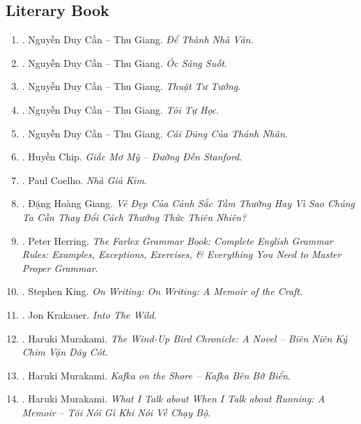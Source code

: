\documentclass{article}
\begin{document}

\subsection{Literary Book}

\begin{enumerate}
	\item \cite{Can_dtnv}. {\sc Nguyễn Duy Cần -- Thu Giang}. {\it Để Thành Nhà Văn}.\hfill{\sf[done]}
	\item \cite{Can_oss}. {\sc Nguyễn Duy Cần -- Thu Giang}. {\it Óc Sáng Suốt}.\hfill{\sf[reading]}
	\item \cite{Can_ttt}. {\sc Nguyễn Duy Cần -- Thu Giang}. {\it Thuật Tư Tưởng}.\hfill{\sf[reading]}
	\item \cite{Can_tth}. {\sc Nguyễn Duy Cần -- Thu Giang}. {\it Tôi Tự Học}.\hfill{\sf[reading]}
	\item \cite{Can_dung_thanh_nhan}. {\sc Nguyễn Duy Cần -- Thu Giang}. {\it Cái Dũng Của Thánh Nhân}.\hfill{\sf[reading]}
	\item \cite{Chip_US_dream}. {\sc Huyền Chip}. {\it Giấc Mơ Mỹ -- Đường Đến Stanford}.\hfill{\sf[done]}
	\item \cite{Coelho_alchemist_VN}. {\sc Paul Coelho}. {\it Nhà Giả Kim}.\hfill{\sf[done]}
	\item \cite{Giang_nature}. {\sc Đặng Hoàng Giang}. {\it Vẻ Đẹp Của Cảnh Sắc Tầm Thường Hay Vì Sao Chúng Ta Cần Thay Đổi Cách Thưởng Thức Thiên Nhiên?}\hfill{\sf[done]}
	\item \cite{Herring2016}. {\sc Peter Herring}. {\it The Farlex Grammar Book: Complete English Grammar Rules: Examples, Exceptions, Exercises, \& Everything You Need to Master Proper Grammar}.\hfill{\sf[reading]}
	\item \cite{King2000, King2010}. Stephen King. {\it On Writing: On Writing: A Memoir of the Craft}.\hfill{\sf[done]}
	\item \cite{Krakauer_wild}. {\sc Jon Krakauer}. {\it Into The Wild}.
	\item \cite{Murakami_bird}. Haruki Murakami. {\it The Wind-Up Bird Chronicle: A Novel -- Biên Niên Ký Chim Vặn Dây Cót}.\hfill{\sf[done]}
	\item \cite{Murakami_Kafka}. Haruki Murakami. {\it Kafka on the Shore -- Kafka Bên Bờ Biển}.\hfill{\sf[done]}
	\item \cite{Murakami_run_VN}. Haruki Murakami. {\it What I Talk about When I Talk about Running: A Memoir -- Tôi Nói Gì Khi Nói Về Chạy Bộ}.\\\mbox{}\hfill{\sf[done]}

\end{enumerate}
\end{document}
